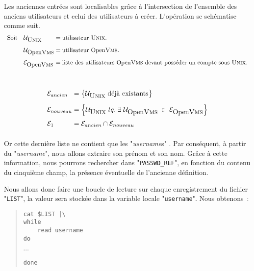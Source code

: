 Les anciennes entr{\'e}es sont localisables gr{\^a}ce {\`a} l'intersection de l'ensemble
des anciens utilisateurs et celui des utilisateurs {\`a} cr{\'e}er. L'op{\'e}ration se
sch{\'e}matise comme suit.
\begin{displaymath}
\begin{array}{l@{\quad}l@{\;=\;}l}
	\mbox{Soit}	&
		\mathcal{U}_{\mbox{{\Unix}}} 		&	\mbox{utilisateur {\Unix}.} 	\\[2ex]
				&
		\mathcal{U}_{\mbox{{\OpenVMS}}} 	&	\mbox{utilisateur {\OpenVMS}.}	\\[2ex]
				&
		\mathcal{E}_{\mbox{{\OpenVMS}}}		&	\mbox{liste des utilisateurs
					{\OpenVMS} devant poss{\'e}der un compte sous {\Unix}.}			\\[2ex]
\end{array}
\end{displaymath}
\\
\begin{displaymath}
\begin{array}{l@{\;=\;}l}
	\mathcal{E}_{ancien}		&
		\left\{ \mathcal{U}_{\mbox{{\Unix}}} \; \mbox{d{\'e}j{\`a} existants} \right\}
		\\[2ex]
	\mathcal{E}_{nouveau}	&
		\left\{ \mathcal{U}_{\mbox{{\Unix}}} \; tq. \;
			\exists \; \mathcal{U}_{\mbox{{\OpenVMS}}} \: \in \: \mathcal{E}_{\mbox{{\OpenVMS}}}
			\right\}
		\\[2ex]
	\mathcal{E}_{1}			&
		\mathcal{E}_{ancien} \cap \mathcal{E}_{nouveau}
		\\[2ex]
\end{array}
\end{displaymath}
Or cette derni{\`e}re liste ne contient que les "{\sl username}s"
{\OpenVMS}. Par cons{\'e}quent, {\`a} partir du "{\sl username}", nous
allons extraire son pr{\'e}nom et son nom. Gr{\^a}ce {\`a} cette information, nous
pourrons rechercher dans "{\tt PASSWD\_REF}", en fonction du contenu
du cinqui{\`e}me champ, la pr{\'e}sence {\'e}ventuelle de l'ancienne d{\'e}finition.

Nous allons donc faire une boucle de lecture sur chaque enregistrement
du fichier "{\tt LIST}", la valeur sera stock{\'e}e dans la variable
locale "{\tt username}". Nous obtenons~:
\begin{quote}
\begin{verbatim}
cat $LIST |\
while
    read username
do
\end{verbatim}
$\cdots$
\begin{verbatim}
done
\end{verbatim}
\end{quote}

